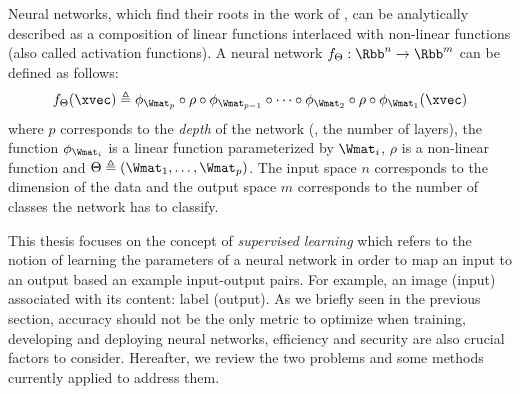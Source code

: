 Neural networks, which find their roots in the work of \citet{mcculloch1943logical,rosenblatt1958perceptron}, can be analytically described as a composition of linear functions interlaced with non-linear functions (also called activation functions).
A neural network $f_\Theta : \Rbb^n \rightarrow \Rbb^m$ can be defined as follows:
\begin{equation}
  f_\Theta(\xvec) \triangleq \phi_{\Wmat_p} \circ \rho \circ \phi_{\Wmat_{p-1}} \circ \cdots \circ \phi_{\Wmat_2} \circ \rho \circ \phi_{\Wmat_1}(\xvec)
  \label{equation:neural_network}
\end{equation}
where $p$ corresponds to the \emph{depth} of the network (\ie, the number of layers), the function $\phi_{\Wmat_i}$ is a linear function parameterized by $\Wmat_i$, $\rho$ is a non-linear function and $\Theta \triangleq ( \Wmat_1, \dots, \Wmat_p )$.
The input space $n$ corresponds to the dimension of the data and the output space $m$ corresponds to the number of classes the network has to classify.

This thesis focuses on the concept of \emph{supervised learning} which refers to the notion of learning the parameters of a neural network in order to map an input to an output based an example input-output pairs.
For example, an image (input) associated with its content: label (output).
As we briefly seen in the previous section, accuracy should not be the only metric to optimize when training, developing and deploying neural networks, efficiency and security are also crucial factors to consider.
Hereafter, we review the two problems and some methods currently applied to address them. 

